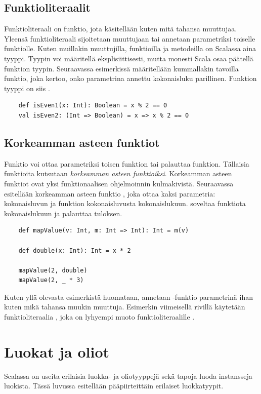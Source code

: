 \subsection{Funktioliteraalit}
Funktioliteraali on funktio, jota käsitellään kuten mitä tahansa muuttujaa. Yleensä funktioliteraali sijoitetaan muuttujaan tai annetaan parametriksi toiselle funktiolle. Kuten muillakin muuttujilla, funktioilla ja metodeilla on Scalassa aina tyyppi. Tyypin voi määritellä eksplisiittisesti, mutta monesti Scala osaa päätellä funktion tyypin.
Seuraavassa esimerkissä määritellään kummallakin tavoilla funktio, joka kertoo, onko parametrina annettu kokonaisluku parillinen. Funktion tyyppi on siis .
\cite[Luku 8]{prorgrammingInScala3rd}
\begin{lstlisting}
    def isEven1(x: Int): Boolean = x % 2 == 0
    val isEven2: (Int => Boolean) = x => x % 2 == 0
\end{lstlisting}

\subsection{Korkeamman asteen funktiot}
Funktio voi ottaa parametriksi toisen funktion tai palauttaa funktion. Tällaisia funktioita kutsutaan \textit{korkeamman asteen funktioiksi}. Korkeamman asteen funktiot ovat yksi funktionaalisen ohjelmoinnin kulmakivistä. Seuraavassa esitellään korkeamman asteen funktio , joka ottaa kaksi parametria: kokonaisluvun ja funktion kokonaisluvusta kokonaislukuun.  soveltaa funktiota kokonaislukuun ja palauttaa tuloksen.
\begin{lstlisting}
    def mapValue(v: Int, m: Int => Int): Int = m(v)
    
    def double(x: Int): Int = x * 2
    
    mapValue(2, double)
    mapValue(2, _ * 3)
\end{lstlisting}
Kuten yllä olevasta esimerkistä huomataan, annetaan -funktio parametrinä ihan kuten mikä tahansa muukin muuttuja. Esimerkin viimeisellä rivillä käytetään funktioliteraalia , joka on lyhyempi muoto funktioliteraalille .
\cite[Luku 12]{scalaForTheImpatient}


\section{Luokat ja oliot} \label{LuokatJaOliot}
Scalassa on useita erilaisia luokka- ja oliotyyppejä sekä tapoja luoda instansseja luokista. Tässä luvussa esitellään pääpiirteittäin erilaiset luokkatyypit.

